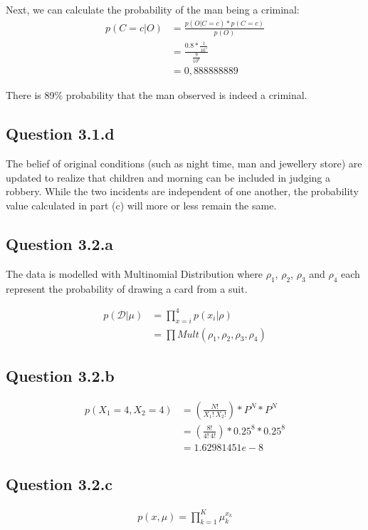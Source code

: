 \documentclass[a4paper]{article}
\begin{document}
Next, we can calculate the probability of the man being a criminal:
\begin{align*}
    p(C=c | O) &= \frac{p(O | C=c) * p(C=c)}{p(O)} \\
               &= \frac{0.8 * \frac{1}{10^5}}{\frac{9}{10^6}} \\
               &= 0,888888889
\end{align*}{}

There is 89\% probability that the man observed is indeed a criminal.

\subsection*{Question 3.1.d}
The belief of original conditions (such as night time, man and jewellery store) are updated to realize that children and morning can be included in judging a robbery. While the two incidents are independent of one another, the probability value calculated in part (c) will more or less remain the same.
\bigskip

\subsection*{Question 3.2.a}
The data is modelled with Multinomial Distribution where $\rho_{1}$, $\rho_{2}$, $\rho_{3}$ and $\rho_{4}$ each represent the probability of drawing a card from a suit.

\begin{align*}
     p(\mathcal{D} | \mu) &= \prod_{x=i}^4 p(x_{i} | \rho) \\
                          &= \prod Mult(\rho_{1}, \rho_{2}, \rho_{3}, \rho_{4})
\end{align*}{}

\subsection*{Question 3.2.b}
\begin{align*}
    p(X_{1}=4, X_{2}=4) &= (\frac{N!}{X_{1}!\ X_{2}!})* P^N * P^N \\
                        &= (\frac{8!}{4!\ 4!})* 0.25^8 * 0.25^8 \\
                        &= 1.62981451e-8
\end{align*}

\subsection*{Question 3.2.c}
\begin{align*}
    p(x, \mu) =  \prod_{k=1}^K \mu_k^{x_k}
\end{align*}
\end{document}
